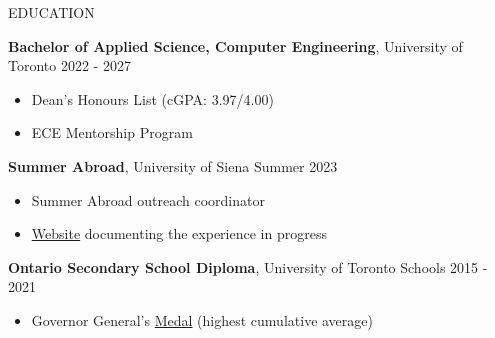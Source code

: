 \documentclass{resume} %
\begin{document}
\begin{rSection}{EDUCATION}

    {\bf Bachelor of Applied Science, Computer Engineering}, University of Toronto \hfill {2022 - 2027}
    \vspace{-0.2cm}
    \begin{itemize}
     \itemsep -8pt {} 
      \item  Dean's Honours List (cGPA: 3.97/4.00)
      \item  ECE Mentorship Program
    \end{itemize}

    {\bf Summer Abroad}, University of Siena \hfill {Summer 2023}
    \vspace{-0.2cm}
    \begin{itemize}
     \itemsep -8pt {} 
      \item  Summer Abroad outreach coordinator
      \item  \href{https://github.com/endothermiic/serendipity}{Website} documenting the experience in progress
    \end{itemize}

    {\bf Ontario Secondary School Diploma}, University of Toronto Schools \hfill {2015 - 2021}
    \vspace{-0.2cm}
    \begin{itemize}
     \itemsep -8pt {} 
      \item  Governor General’s \href{https://www.gg.ca/en/honours/recipients/116-110249}{Medal} (highest cumulative average)
    \end{itemize}

\end{rSection}
\end{document}
